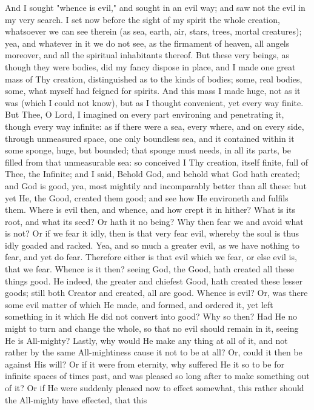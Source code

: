 \documentclass[b5paper,openright,12pt,twoside]{book}
\begin{document}
And I sought "whence is evil," and sought in an evil way; and saw not
the evil in my very search. I set now before the sight of my spirit
the whole creation, whatsoever we can see therein (as sea, earth, air,
stars, trees, mortal creatures); yea, and whatever in it we do not see,
as the firmament of heaven, all angels moreover, and all the spiritual
inhabitants thereof. But these very beings, as though they were
bodies, did my fancy dispose in place, and I made one great mass of Thy
creation, distinguished as to the kinds of bodies; some, real bodies,
some, what myself had feigned for spirits. And this mass I made huge,
not as it was (which I could not know), but as I thought convenient, yet
every way finite. But Thee, O Lord, I imagined on every part environing
and penetrating it, though every way infinite: as if there were a sea,
every where, and on every side, through unmeasured space, one only
boundless sea, and it contained within it some sponge, huge, but
bounded; that sponge must needs, in all its parts, be filled from that
unmeasurable sea: so conceived I Thy creation, itself finite, full of
Thee, the Infinite; and I said, Behold God, and behold what God hath
created; and God is good, yea, most mightily and incomparably better
than all these: but yet He, the Good, created them good; and see how
He environeth and fulfils them. Where is evil then, and whence, and how
crept it in hither? What is its root, and what its seed? Or hath it no
being? Why then fear we and avoid what is not? Or if we fear it idly,
then is that very fear evil, whereby the soul is thus idly goaded and
racked. Yea, and so much a greater evil, as we have nothing to fear, and
yet do fear. Therefore either is that evil which we fear, or else evil
is, that we fear. Whence is it then? seeing God, the Good, hath created
all these things good. He indeed, the greater and chiefest Good, hath
created these lesser goods; still both Creator and created, all are
good. Whence is evil? Or, was there some evil matter of which He made,
and formed, and ordered it, yet left something in it which He did not
convert into good? Why so then? Had He no might to turn and change the
whole, so that no evil should remain in it, seeing He is All-mighty?
Lastly, why would He make any thing at all of it, and not rather by
the same All-mightiness cause it not to be at all? Or, could it then be
against His will? Or if it were from eternity, why suffered He it so to
be for infinite spaces of times past, and was pleased so long after to
make something out of it? Or if He were suddenly pleased now to effect
somewhat, this rather should the All-mighty have effected, that this
\end{document}
